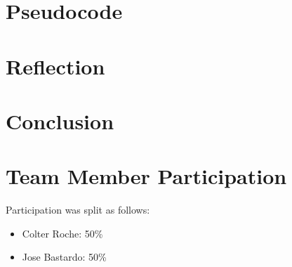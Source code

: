 \documentclass[12pt, letterpaper]{article}
\begin{document}
    \section{Pseudocode}
    \section{Reflection}
    \section{Conclusion}
    \section{Team Member Participation}
    Participation was split as follows:
    \begin{itemize}
        \item Colter Roche: 50\%
        \item Jose Bastardo: 50\%
    \end{itemize}
\end{document}
